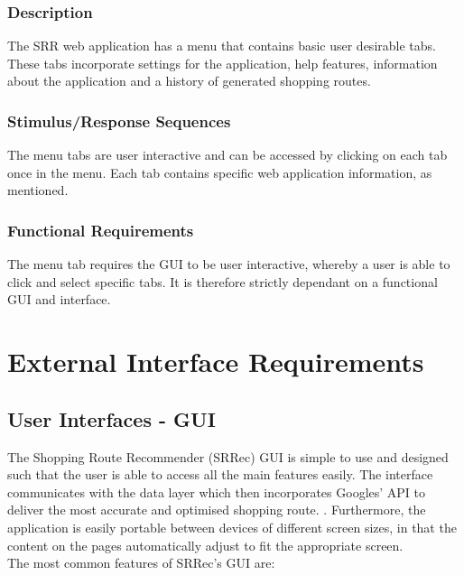 \documentclass[10pt, a4paper, onecolumn]{scrartcl}
\begin{document}
			\subsubsection{Description}
			
				The SRR web application has a menu that contains basic user desirable tabs. These tabs incorporate settings for the application, help features, information about the application and a history of generated shopping routes. 
			
			\subsubsection{Stimulus/Response Sequences}
			
				The menu tabs are user interactive and can be accessed by clicking on each tab once in the menu. Each tab contains specific web application information, as mentioned. 
			
			\subsubsection{Functional Requirements}
			
				The menu tab requires the GUI to be user interactive, whereby a user is able to click and select specific tabs. It is therefore strictly dependant on a functional GUI and interface.
				
	
	\section{External Interface Requirements}
	
		\subsection{User Interfaces - GUI}
		
				The Shopping Route Recommender (SRRec) GUI is simple to use and designed such that the user is able to access all the main features easily. The interface communicates with the data layer which then incorporates Googles' API to deliver the most accurate and optimised shopping route. . Furthermore, the application is easily portable between devices of different screen sizes, in that the content on the pages automatically adjust to fit the appropriate screen.\\
				
				The most common features of SRRec's GUI are:
				
\end{document}
